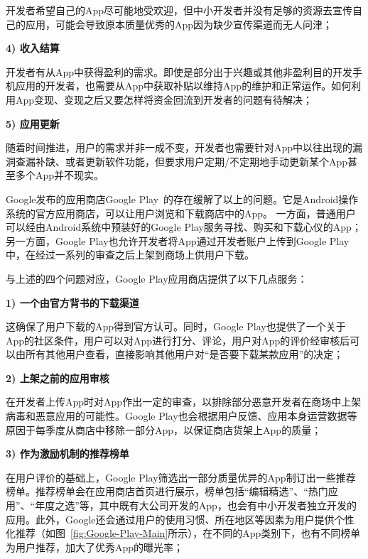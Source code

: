开发者希望自己的App尽可能地受欢迎，但中小开发者并没有足够的资源去宣传自己的应用，可能会导致原本质量优秀的App因为缺少宣传渠道而无人问津；

\textbf{4) 收入结算}

开发者有从App中获得盈利的需求。即使是部分出于兴趣或其他非盈利目的开发手机应用的开发者，也需要从App中获取补贴以维持App的维护和正常运作。如何利用App变现、变现之后又要怎样将资金回流到开发者的问题有待解决；

\textbf{5) 应用更新}

随着时间推进，用户的需求并非一成不变，开发者也需要针对App中以往出现的漏洞查漏补缺、或者更新软件功能，但要求用户定期/不定期地手动更新某个App甚至多个App并不现实。

Google发布的应用商店Google Play~\cite{GooglePlay}的存在缓解了以上的问题。它是Android操作系统的官方应用商店，可以让用户浏览和下载商店中的App。
一方面，普通用户可以经由Android系统中预装好的Google Play服务寻找、购买和下载心仪的App；另一方面，Google Play也允许开发者将App通过开发者账户上传到Google Play中，在经过一系列的审查之后上架到商场上供用户下载。

与上述的四个问题对应，Google Play应用商店提供了以下几点服务：

\textbf{1) 一个由官方背书的下载渠道}

这确保了用户下载的App得到官方认可。同时，Google Play也提供了一个关于App的社区条件，用户可以对App进行打分、评论，用户对App的评价经审核后可以由所有其他用户查看，直接影响其他用户对``是否要下载某款应用''的决定；

\textbf{2) 上架之前的应用审核}

在开发者上传App时对App作出一定的审查，以排除部分恶意开发者在商场中上架病毒和恶意应用的可能性。Google Play也会根据用户反馈、应用本身运营数据等原因于每季度从商店中移除一部分App，以保证商店货架上App的质量；

\textbf{3) 作为激励机制的推荐榜单}

在用户评价的基础上，Google Play筛选出一部分质量优异的App制订出一些推荐榜单。推荐榜单会在应用商店首页进行展示，榜单包括``编辑精选''、``热门应用''、``年度之选''等，其中既有大公司开发的App，也会有中小开发者独立开发的应用。此外，Google还会通过用户的使用习惯、所在地区等因素为用户提供个性化推荐（如图~\ref{fig:Google-Play-Main}所示），在不同的App类别下，也有不同榜单为用户推荐，加大了优秀App的曝光率；

